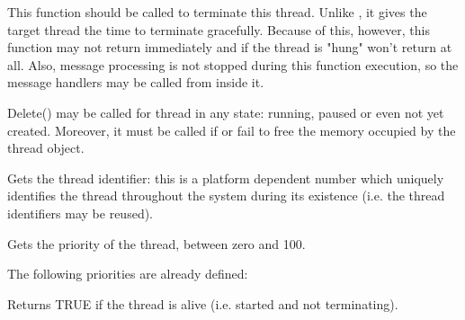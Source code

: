\twocolwidtha{7cm}
\begin{twocollist}\itemsep=0pt
\end{twocollist}

\label{wxthreaddelete}


This function should be called to terminate this thread. Unlike , it
gives the target thread the time to terminate gracefully. Because of this, however, this function
may not return immediately and if the thread is "hung" won't return at all. Also, message processing
is not stopped during this function execution, so the message handlers may be called from inside
it.

Delete() may be called for thread in any state: running, paused or even not yet created. Moreover,
it must be called if  or  fail to free
the memory occupied by the thread object.

\label{wxthreadgetid}


Gets the thread identifier: this is a platform dependent number which uniquely identifies the
thread throughout the system during its existence (i.e. the thread identifiers may be reused).

\label{wxthreadgetpriority}


Gets the priority of the thread, between zero and 100.

The following priorities are already defined:

\twocolwidtha{7cm}
\begin{twocollist}\itemsep=0pt
\end{twocollist}

\label{wxthreadisalive}


Returns TRUE if the thread is alive (i.e. started and not terminating).

